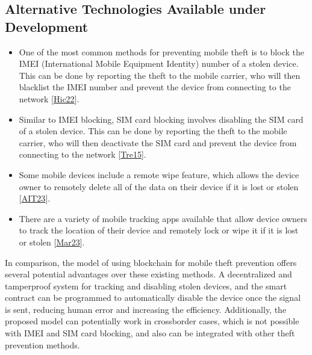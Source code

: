 \documentclass[letterpaper,10pt,english]{jupyterBook}
\begin{document}
\subsection{Alternative Technologies Available under Development}
\label{\detokenize{MTP/mtp:alternative-technologies-available-under-development}}\begin{itemize}
\item {} 
\sphinxAtStartPar
{} One of the most common methods for preventing mobile theft is to block the IMEI (International Mobile Equipment Identity) number of a stolen device. This can be done by reporting the theft to the mobile carrier, who will then blacklist the IMEI number and prevent the device from connecting to the network {[}\hyperlink{cite.MTP/mtp:id25}{Hic22}{]}.

\item {} 
\sphinxAtStartPar
{} Similar to IMEI blocking, SIM card blocking involves disabling the SIM card of a stolen device. This can be done by reporting the theft to the mobile carrier, who will then deactivate the SIM card and prevent the device from connecting to the network {[}\hyperlink{cite.MTP/mtp:id26}{Tre15}{]}.

\item {} 
\sphinxAtStartPar
{} Some mobile devices include a remote wipe feature, which allows the device owner to remotely delete all of the data on their device if it is lost or stolen {[}\hyperlink{cite.MTP/mtp:id27}{AIT23}{]}.

\item {} 
\sphinxAtStartPar
{} There are a variety of mobile tracking apps available that allow device owners to track the location of their device and remotely lock or wipe it if it is lost or stolen {[}\hyperlink{cite.MTP/mtp:id28}{Mar23}{]}.

\end{itemize}

\sphinxAtStartPar
In comparison, the model of using blockchain for mobile theft prevention offers several potential advantages over these existing methods. A decentralized and tamper\sphinxhyphen{}proof system for tracking and disabling stolen devices, and the smart contract can be programmed to automatically disable the device once the signal is sent, reducing human error and increasing the efficiency. Additionally, the proposed model can potentially work in cross\sphinxhyphen{}border cases, which is not possible with IMEI and SIM card blocking, and also can be integrated with other theft prevention methods.
\end{document}
